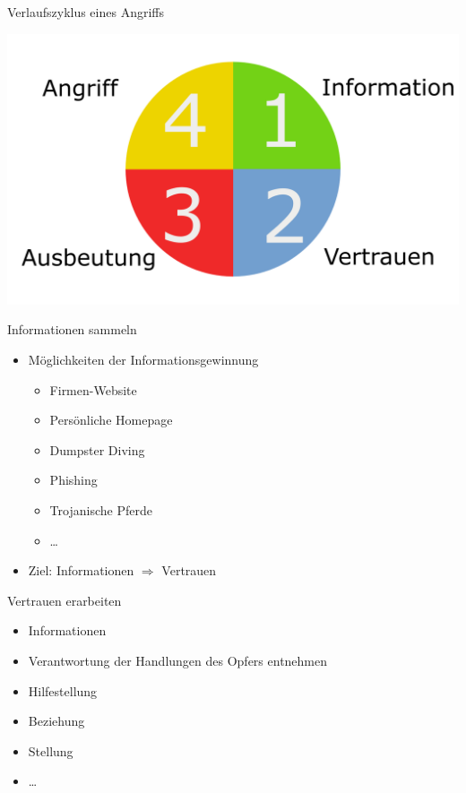 \documentclass[11pt]{beamer}
\begin{document}
\begin{frame}[t]{Verlaufszyklus eines Angriffs}
  \begin{center}
    \includegraphics[height=0.75\textheight]{cycle}
  \end{center}
\end{frame}

\begin{frame}{Informationen sammeln}
  \begin{itemize}
    \item Möglichkeiten der Informationsgewinnung
      \begin{itemize}
      \item Firmen-Website
      \item Persönliche Homepage
      \item Dumpster Diving
      \item Phishing
      \item Trojanische Pferde
      \item \dots
      \end{itemize}
    \item Ziel: Informationen $\Rightarrow$ Vertrauen
  \end{itemize}
\end{frame}

\begin{frame}{Vertrauen erarbeiten}
  \begin{itemize}
    \item Informationen
    \item Verantwortung der Handlungen des Opfers entnehmen
    \item Hilfestellung
    \item Beziehung
    \item Stellung
    \item \dots
  \end{itemize}
\end{frame}
\end{document}
